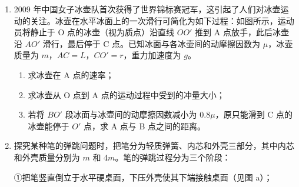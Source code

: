 \documentclass[\gkver]{gaokaozhenti}
\begin{document}
\begin{enumerate}
{

}

\item
2009 年中国女子冰壶队首次获得了世界锦标赛冠军，这引起了人们对冰壶运动的关注。冰壶在水平冰面上的一次滑行可简化为如下过程：如图所示，运动员将静止于 O 点的冰壶（视为质点）沿直线 $OO'$ 推到 A 点放手，此后冰壶沿 $AO'$ 滑行，最后停于 C 点。已知冰面与各冰壶间的动摩擦因数为 $\mu$，冰壶质量为 $m$，$AC=L$，$CO'=r$，重力加速度为 $g$。
\begin{enumerate}
	\item
	求冰壶在 A 点的速率；
	\item
	求冰壶从 O 点到 A 点的运动过程中受到的冲量大小；
	\item
	若将 $BO'$ 段冰面与冰壶间的动摩擦因数减小为 $0.8\mu$，原只能滑到 C 点的冰壶能停于 $O'$ 点，求 A 点与 B 点之间的距离。
\end{enumerate}


\item
探究某种笔的弹跳问题时，把笔分为轻质弹簧、内芯和外壳三部分，其中内芯和外壳质量分别为 $m$ 和 $4m$。笔的弹跳过程分为三个阶段：

①把笔竖直倒立于水平硬桌面，下压外壳使其下端接触桌面（见图 a）；


\end{enumerate}
\end{document}
